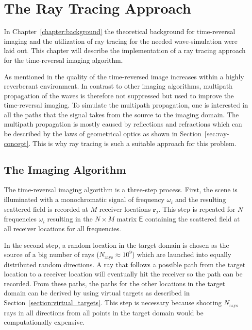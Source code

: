 
\chapter{The Ray Tracing Approach}\label{chapter:the_raytracing_approach}
In Chapter~\ref{chapter:background} the theoretical background for time-reversal imaging and the utilization of ray tracing for the needed wave-simulation were laid out.
This chapter will describe the implementation of a ray tracing approach for the time-reversal imaging algorithm.

As mentioned in \parencite{dyab_critical_2013} the quality of the time-reversed image increases within a highly reverberant environment.
In contrast to other imaging algorithms, multipath propagation of the waves is therefore not suppressed but used to improve the time-reversal imaging.
To simulate the multipath propagation, one is interested in all the paths that the signal takes from the source to the imaging domain.
The multipath propagation is mostly caused by reflections and refractions which can be described by the laws of geometrical optics as shown in Section~\ref{sec:ray-concept}.
This is why ray tracing is such a suitable approach for this problem.

\section{The Imaging Algorithm}
The time-reversal imaging algorithm is a three-step process.
First, the scene is illuminated with a monochromatic signal of frequency \(\omega_i\) and the resulting scattered field is recorded at \(M\) receiver locations \(\bm{r}_j\). 
This step is repeated for \(N\) frequencies \(\omega_i\) resulting in the \(N \times M\) matrix \(\mathsf{E} \) containing the scattered field at all receiver locations for all frequencies.

In the second step, a random location in the target domain is chosen as the source of a big number of rays (\(N_{\text{rays}}\approx 10^{9}\)) which are launched into equally distributed random directions.
A ray that follows a possible path from the target location to a receiver location will eventually hit the receiver so the path can be recorded.
From these paths, the paths for the other locations in the target domain can be derived by using virtual targets as described in Section~\ref{section:virtual_targets}.
This step is necessary because shooting \(N_{\text{rays}}\) rays in all directions from all points in the target domain would be computationally expensive.

